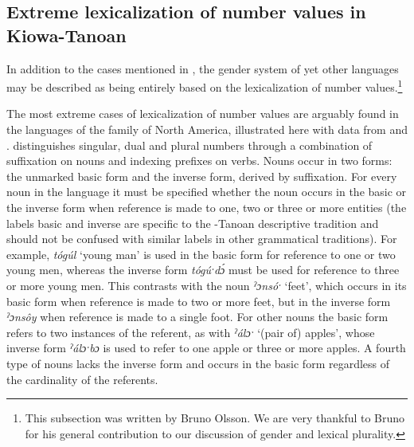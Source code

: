 \documentclass[output=collectionpaper]{langsci/langscibook}
\begin{document}
  \subsection{Extreme lexicalization of number values in Kiowa-Tanoan}

In addition to the cases mentioned in , the gender system of yet other languages may be described as being entirely based on the lexicalization of number values.\footnote{%
This subsection was written by Bruno Olsson. We are very thankful to Bruno for his general contribution to our discussion of gender and lexical plurality.
} %

The most extreme cases of lexicalization of number values are arguably found in the languages of the  family of North America, illustrated here with  data from \cite[310]{Sutton2014} and \cite[78]{Watkins1984}.  distinguishes singular, dual and plural numbers through a combination of suffixation on nouns and indexing prefixes on verbs. Nouns occur in two forms: the unmarked basic form and the inverse form, derived by suffixation. For every noun in the language it must be specified whether the noun occurs in the basic or the inverse form when reference is made to one, two or three or more entities (the labels basic and inverse are specific to the -Tanoan descriptive tradition and should not be confused with similar labels in other grammatical traditions). For example, \textit{tógúl} `young man' is used in the basic form for reference to one or two young men, whereas the inverse form \textit{tógúˑdɔ́} must be used for reference to three or more young men. This contrasts with the noun \textit{ˀɔnsóˑ} `feet', which occurs in its basic form when reference is made to two or more feet, but in the inverse form \textit{ˀɔnsôy} when reference is made to a single foot. For other nouns the basic form refers to two instances of the referent, as with \textit{ˀálɔˑ} `(pair of) apples', whose inverse form \textit{ˀálɔˑbɔ} is used to refer to one apple or three or more apples. A fourth type of nouns lacks the inverse form and occurs in the basic form regardless of the cardinality of the referents.
\end{document}
